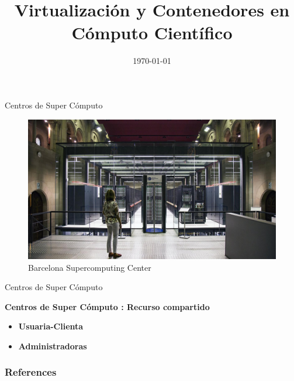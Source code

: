 \documentclass[11pt]{beamer}
\title[]{Virtualización y Contenedores en Cómputo Científico}
\institute[ITESM]{Data Pub\\ ITESM}
\date{\today}
\begin{document}
\begin{frame}
\titlepage
\end{frame}


\begin{frame}{Centros de Super Cómputo}
	\begin{figure}
		\includegraphics[scale=0.2]{images/barcelona_supercomputing.jpg}
		\caption{Barcelona Supercomputing Center}
	\end{figure}
\end{frame}

\begin{frame}{Centros de Super Cómputo}
	\begin{center}
		\textbf{Centros de Super Cómputo : Recurso compartido}
	\end{center}
	
	\begin{itemize}
		\item  \textbf{Usuaria-Clienta} 
		\item \textbf{Administradoras}
		
	\end{itemize}

\end{frame}


\begin{frame}[allowframebreaks]
        \frametitle{References}
		

       
\end{frame}
\end{document}
